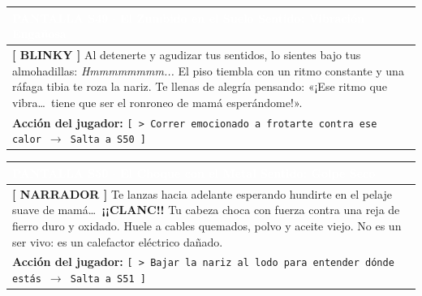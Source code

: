 \documentclass[11pt, a4paper]{article}
\begin{document}
\vspace{1em}

\noindent
\begin{tabularx}{\textwidth}{|X|}
\hline
\rowcolor{colorHeader}
\textbf{\textcolor{white}{PANTALLA S49 $\cdot$ El Zumbido en el Suelo}} \hfill \small\textcolor{white}{Sentido: Vibración Engañosa} \\ \hline
\rowcolor{colorTextoBox}
\textbf{\textcolor{colorEmisor}{[ BLINKY ]}} \vspace{0.2em}\newline
Al detenerte y agudizar tus sentidos, lo sientes bajo tus almohadillas: \textit{Hmmmmmmmm...} El piso tiembla con un ritmo constante y una ráfaga tibia te roza la nariz. Te llenas de alegría pensando: «¡Ese ritmo que vibra\ldots\ tiene que ser el ronroneo de mamá esperándome!». \\ \hline
\rowcolor{colorBotonBox}
\textbf{Acción del jugador:} \newline
\texttt{[ > Correr emocionado a frotarte contra ese calor $\rightarrow$ Salta a S50 ]} \\ \hline
\end{tabularx}

\vspace{1em}

\noindent
\begin{tabularx}{\textwidth}{|X|}
\hline
\rowcolor{colorAlerta}
\textbf{\textcolor{white}{PANTALLA S50 $\cdot$ El Choque con el Metal}} \hfill \small\textcolor{white}{Sentido: Golpe Seco} \\ \hline
\rowcolor{colorTextoBox}
\textbf{\textcolor{colorAlerta}{[ NARRADOR ]}} \vspace{0.2em}\newline
Te lanzas hacia adelante esperando hundirte en el pelaje suave de mamá\ldots\ \textbf{¡¡CLANC!!} Tu cabeza choca con fuerza contra una reja de fierro duro y oxidado. Huele a cables quemados, polvo y aceite viejo. No es un ser vivo: es un calefactor eléctrico dañado. \\ \hline
\rowcolor{colorBotonBox}
\textbf{Acción del jugador:} \newline
\texttt{[ > Bajar la nariz al lodo para entender dónde estás $\rightarrow$ Salta a S51 ]} \\ \hline
\end{tabularx}

\vspace{1em}
\end{document}
